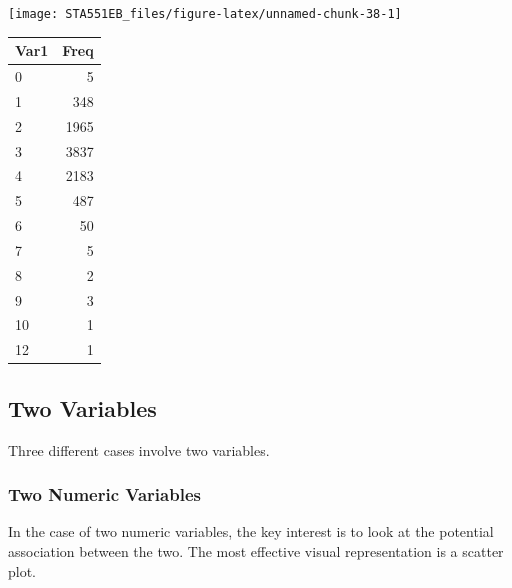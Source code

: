 \documentclass[
]{book}
\newenvironment{Shaded}{\begin{snugshade}}{\end{snugshade}}
\newcommand{\FunctionTok}[1]{\textcolor[rgb]{0.13,0.29,0.53}{\textbf{#1}}}
\newcommand{\NormalTok}[1]{#1}
\newcommand{\SpecialCharTok}[1]{\textcolor[rgb]{0.81,0.36,0.00}{\textbf{#1}}}
\begin{document}
\begin{center}\texttt{[image: STA551EB\_files/figure-latex/unnamed-chunk-38-1]} \end{center}

\begin{Shaded}
\end{Shaded}

\begin{tabular}{l|r}
\hline
Var1 & Freq\\
\hline
0 & 5\\
\hline
1 & 348\\
\hline
2 & 1965\\
\hline
3 & 3837\\
\hline
4 & 2183\\
\hline
5 & 487\\
\hline
6 & 50\\
\hline
7 & 5\\
\hline
8 & 2\\
\hline
9 & 3\\
\hline
10 & 1\\
\hline
12 & 1\\
\hline
\end{tabular}

\hypertarget{two-variables}{%
\subsection{Two Variables}\label{two-variables}}

Three different cases involve two variables.

\hypertarget{two-numeric-variables}{%
\subsubsection{Two Numeric Variables}\label{two-numeric-variables}}

In the case of two numeric variables, the key interest is to look at the potential association between the two. The most effective visual representation is a scatter plot.

\begin{Shaded}
\end{Shaded}
\end{document}
